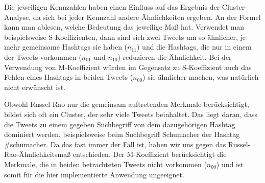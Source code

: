 
Die jeweiligen Kennzahlen haben einen Einfluss auf das Ergebnis der Cluster-Analyse, da sich bei jeder Kennzahl andere Ähnlichkeiten ergeben. 
An der Formel kann man ablesen, welche Bedeutung das jeweilige Maß hat. Verwendet man beispielsweise S-Ko\-ef\-fi\-zi\-en\-ten, dann sind sich zwei Tweets
um so ähnlicher, je mehr gemeinsame Hashtags sie haben ($n_{11}$) und die Hashtags, die nur in einem der Tweets vorkommen ($n_{01}$ und $n_{10}$) reduzieren die Ähnlichkeit.
Bei der Verwendung von M-Koeffizient würden im Gegensatz zu  S-Koeffizient auch das Fehlen eines  Hashtags in beiden Tweets ($n_{00}$) sie ähnlicher machen,
was natürlich nicht erwünscht ist.

Obwohl Russel Rao nur die gemeinsam
auftretenden Merkmale berücksichtigt, bildet sich oft ein Cluster, der sehr viele Tweets beinhaltet. Das liegt daran, dass
die Tweets zu einem gegeben Suchbegriff von dem dazugehörigen Hashtag dominiert werden, bei\-spiels\-wei\-se beim Suchbegriff Schumacher der Hashtag \glqq \#schumacher\grqq{}. Da das fast immer der Fall ist, haben wir uns gegen das Russel-Rao-Ähnlichkeitsmaß entschieden.
Der M-Koeffizient berücksichtigt
die Merkmale, die in beiden betrachteten Tweets nicht vorkommen ($n_{00}$) und ist somit für die hier implementierte Anwendung ungeeignet.

